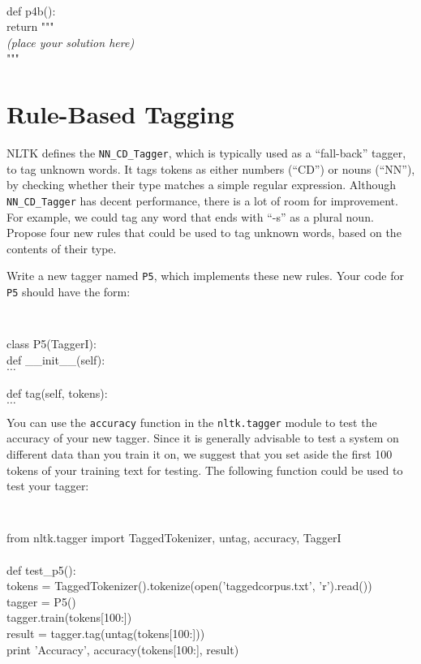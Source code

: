 \documentclass{cis530}
\begin{document}
{\tt
\begin{tabbing}
def p4b():\\
\qquad return """\\
\textit{(place your solution here)}\\
"""
\end{tabbing}
}

\section{Rule-Based Tagging}

NLTK defines the \texttt{NN\_CD\_Tagger}, which is typically used as a
``fall-back'' tagger, to tag unknown words.  It tags tokens as either
numbers (``CD'') or nouns (``NN''), by checking whether their type
matches a simple regular expression.  Although \texttt{NN\_CD\_Tagger}
has decent performance, there is a lot of room for improvement.  For
example, we could tag any word that ends with ``-s'' as a plural noun.
Propose four new rules that could be used to tag unknown words, based
on the contents of their type.

Write a new tagger named \texttt{P5}, which implements these new
rules.  Your code for \texttt{P5} should have the form:

{\tt
\begin{tabbing}
class P5(TaggerI):\\
\qquad def \_\_init\_\_(self):\\
\qquad\qquad $\ldots$\\
\\
\qquad def tag(self, tokens):\\
\qquad\qquad $\ldots$
\end{tabbing}
}

\newpage
You can use the \texttt{accuracy} function in the \texttt{nltk.tagger}
module to test the accuracy of your new tagger.  Since it is generally
advisable to test a system on different data than you train it on, we
suggest that you set aside the first 100 tokens of your training text
for testing.  The following function could be used to test your
tagger:

{\tt
\begin{tabbing}
from nltk.tagger import TaggedTokenizer, untag, accuracy, TaggerI\\
\\
def test\_p5():\\
\qquad tokens = TaggedTokenizer().tokenize(open('taggedcorpus.txt', 'r').read())\\
\qquad tagger = P5()\\
\qquad tagger.train(tokens[100:])\\
\qquad result = tagger.tag(untag(tokens[100:]))\\
\qquad print 'Accuracy', accuracy(tokens[100:], result)
\end{tabbing}
}
\end{document}

